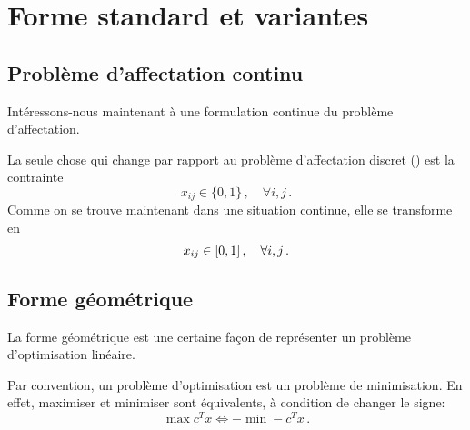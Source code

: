 \section{Forme standard et variantes}

\subsection{Problème d'affectation continu}

	Intéressons-nous maintenant
	à une formulation continue du problème d'affectation.

	La seule chose qui change
	par rapport au problème d'affectation discret ()
	est la contrainte
	\[
	x_{ij} \in \{0, 1\}\,, \quad \forall i,j\,.
	\]
	Comme on se trouve maintenant dans une situation continue,
	elle se transforme en
	\[
	x_{ij} \in \interval{0}{1}\,, \quad \forall i,j\,.
	\]

\subsection{Forme géométrique}

	La forme géométrique est une certaine façon
	de représenter un problème d'optimisation linéaire.

	Par convention, un problème d'optimisation
	est un problème de minimisation.
	En effet, maximiser et minimiser sont équivalents,
	à condition de changer le signe:
	\[
	\max c^T x \iff -\min -c^T x\,.
	\]

